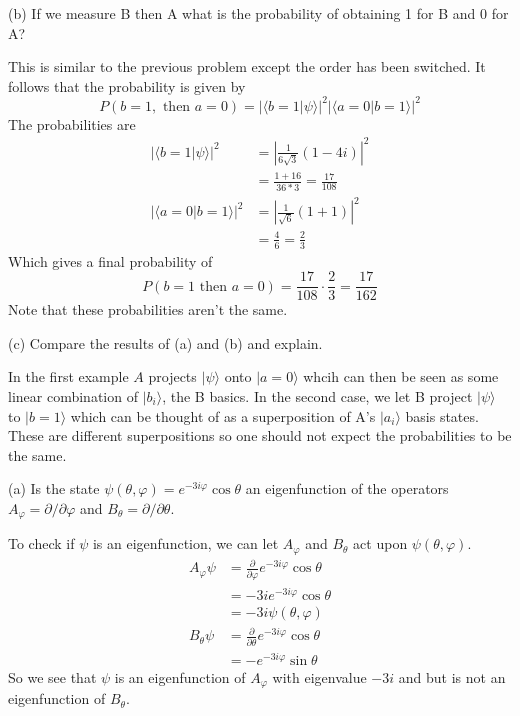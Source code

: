\documentclass[a4paper, 11pt]{article}
\newcommand{\ket}[1]{|#1\rangle}
\newcommand{\braket}[2]{\langle #1 | #2 \rangle}
\newenvironment{solution}{%
	\begin{list}{}{%
			\setlength{\topsep}{0pt}%
			\setlength{\leftmargin}{1.5cm}%
			\setlength{\rightmargin}{1.5cm}%
			\setlength{\listparindent}{\parindent}%
			\setlength{\itemindent}{\parindent}%
			\setlength{\parsep}{\parskip}%
		}%
		\item[]}{\end{list}}
\begin{document}
\noindent(b) If we measure B then A what is the probability of obtaining 1 for B and 0 for A? 
	\begin{solution}
		This is similar to the previous problem except the order has been switched. It follows that the probability is given by 	
			\begin{equation*}
					P(b=1, \text{ then } a=0) = \left|\braket{b=1}{\psi}\right|^2\left|\braket{a=0}{b=1}\right|^2
			\end{equation*}
		The probabilities are 
			\begin{align*}
				\left|\braket{b=1}{\psi}\right|^2 &= \left| \frac{1}{6\sqrt{3}}(1-4i) \right|^2 \\ 
					&= \frac{1+16}{36*3} = \frac{17}{108} \\
				\left|\braket{a=0}{b=1}\right|^2 &= \left| \frac{1}{\sqrt{6}}(1+1)\right|^2 \\
					&= \frac{4}{6} = \frac{2}{3} 
			\end{align*}
		Which gives a final probability of 
			\begin{equation*}
				P(b=1 \text{ then } a=0) = \frac{17}{108}\cdot \frac{2}{3} = \frac{17}{162}
			\end{equation*}
		Note that these probabilities aren't the same. \\
	\end{solution}

\noindent (c) Compare the results of (a) and (b) and explain. \\
	\begin{solution}
		\noindent In the first example $A$ projects $\ket{\psi}$ onto $\ket{a=0}$ whcih can then be seen as some linear combination of $\ket{b_i}$, the B basics. In the second case, we let B project $\ket{\psi}$ to $\ket{b=1}$ which can be thought of as a superposition of A's $\ket{a_i}$ basis states. These are different superpositions so one should not expect the probabilities to be the same. \\
	\end{solution}

 (a) Is the state $\psi(\theta, \varphi) = e^{-3i\varphi}\cos\theta$ an eigenfunction of the operators $A_\varphi = \partial/\partial\varphi$ and $B_\theta = \partial/\partial\theta$. 
	\begin{solution}
		\noindent To check if $\psi$ is an eigenfunction, we can let $A_\varphi$ and $B_\theta$ act upon $\psi(\theta, \varphi)$. 	
			\begin{align*}
				A_\varphi\psi &= \frac{\partial}{\partial \varphi}e^{-3i\varphi}\cos\theta \\
					&= -3ie^{-3i\varphi}\cos\theta \\ 
					&= -3i\psi(\theta, \varphi) \\ 
				B_\theta\psi &= \frac{\partial}{\partial \theta}e^{-3i\varphi}\cos\theta \\ 
					&= -e^{-3i\varphi}\sin\theta 
			\end{align*}
		So we see that $\psi$ is an eigenfunction of $A_\varphi$ with eigenvalue $-3i$ and but is not an eigenfunction of $B_\theta$. 
		\end{solution}
\end{document}
